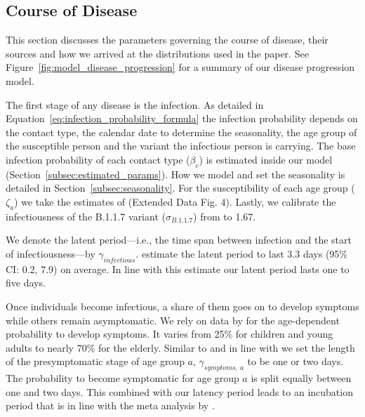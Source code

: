 \subsection{Course of Disease}
\label{sub:data_course_of_disease}

This section discusses the parameters governing the course of disease, their sources and
how we arrived at the distributions used in the paper.
See Figure~\ref{fig:model_disease_progression} for a summary of our
disease progression model.

The first stage of any disease is the infection. As detailed in
Equation~\ref{eq:infection_probability_formula} the infection
probability depends on the contact type, the calendar date to determine the seasonality,
the age group of the susceptible person and the variant the infectious person is
carrying.
%
The base infection probability of each contact type ($\beta_c$) is estimated inside our
model (Section~\ref{subsec:estimated_params}). How we model and set the seasonality is
detailed in Section~\ref{subsec:seasonality}. For the susceptibility of each age group
($\zeta_a$) we take the estimates of \citet{Davies2020} (Extended Data Fig. 4). Lastly,
we calibrate the infectiousness of the B.1.1.7 variant ($\sigma_{B.1.1.7}$) from
\citet{Davies2021} to 1.67.


We denote the latent period---i.e., the time span between infection and the start of
infectiousness---by $\gamma_{infectious}$. \cite{Zhao2021} estimate the latent period to
last 3.3 days (95\% CI: 0.2, 7.9) on average. In line with this estimate our latent
period lasts one to five days.

Once individuals become infectious, a share of them goes on to develop symptoms while
others remain asymptomatic. We rely on data by \cite{Davies2020} for the age-dependent
probability to develop symptoms. It varies from 25\% for children and young adults to
nearly 70\% for the elderly.
Similar to \citet{Peak2020} and in line with \citet{He2020} we set the length of the
presymptomatic stage of age group $a$, $\gamma_{symptoms,\:a}$ to be one or two days. The
probability to become symptomatic for age group $a$ is split equally between one and two
days. This combined with our latency period leads to an incubation period that is in line
with the meta analysis by \citet{McAloon2020}.

